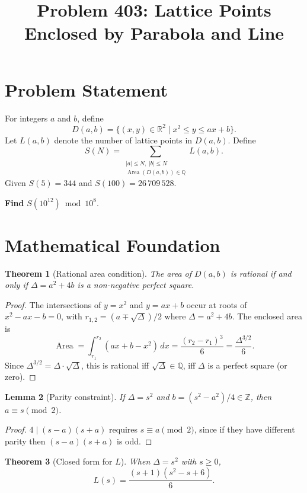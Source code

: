 \documentclass[11pt,a4paper]{article}
\title{Problem 403: Lattice Points Enclosed by Parabola and Line}
\author{}
\date{}
\newtheorem{theorem}{Theorem}
\newtheorem{lemma}[theorem]{Lemma}
\begin{document}
\maketitle

\section{Problem Statement}

For integers $a$ and $b$, define
\[
D(a,b) = \bigl\{(x,y) \in \mathbb{R}^2 \mid x^2 \le y \le ax + b \bigr\}.
\]
Let $L(a,b)$ denote the number of lattice points in $D(a,b)$.  Define
\[
S(N) = \sum_{\substack{|a| \le N,\; |b| \le N \\ \operatorname{Area}(D(a,b)) \in \mathbb{Q}}} L(a,b).
\]
Given $S(5) = 344$ and $S(100) = 26\,709\,528$.

\medskip\noindent\textbf{Find} $S(10^{12}) \bmod 10^8$.

\section{Mathematical Foundation}

\begin{theorem}[Rational area condition]
\label{thm:rational}
The area of $D(a,b)$ is rational if and only if $\Delta = a^2 + 4b$ is a non-negative perfect square.
\end{theorem}

\begin{proof}
The intersections of $y = x^2$ and $y = ax+b$ occur at roots of $x^2 - ax - b = 0$, with $r_{1,2} = (a \mp \sqrt{\Delta})/2$ where $\Delta = a^2 + 4b$.  The enclosed area is
\[
\operatorname{Area} = \int_{r_1}^{r_2}(ax+b-x^2)\,dx = \frac{(r_2-r_1)^3}{6} = \frac{\Delta^{3/2}}{6}.
\]
Since $\Delta^{3/2} = \Delta \cdot \sqrt{\Delta}$, this is rational iff $\sqrt{\Delta} \in \mathbb{Q}$, iff $\Delta$ is a perfect square (or zero).
\end{proof}

\begin{lemma}[Parity constraint]
If $\Delta = s^2$ and $b = (s^2 - a^2)/4 \in \mathbb{Z}$, then $a \equiv s \pmod{2}$.
\end{lemma}

\begin{proof}
$4 \mid (s-a)(s+a)$ requires $s \equiv a \pmod{2}$, since if they have different parity then $(s-a)(s+a)$ is odd.
\end{proof}

\begin{theorem}[Closed form for $L$]
\label{thm:L}
When $\Delta = s^2$ with $s \ge 0$,
\[
L(s) = \frac{(s+1)(s^2 - s + 6)}{6}.
\]
\end{theorem}
\end{document}
